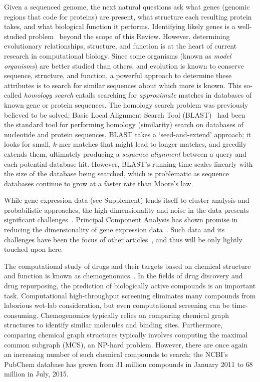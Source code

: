 \documentclass{acm_proc_article-sp}
\begin{document}
Given a sequenced genome, the next natural questions ask what genes (genomic
regions that code for proteins) are present, what structure each resulting
protein takes, and what biological function it performs.
Identifying likely genes is a well-studied problem~\cite{berger2013computational} 
beyond the scope of this Review.
However, determining evolutionary relationships, structure, and function is
at the heart of current research in computational biology.
Since some organisms (known as \emph{model organisms}) are better studied than
others, and evolution is known to conserve sequence, structure, and function,
a powerful approach to determine these attributes is to search for similar
sequences about which more is known. 
This so-called \emph{homology search} entails searching for \emph{approximate}
matches in databases of known gene or protein sequences.
The homology search problem was previously believed to be solved;
Basic Local Alignment Search Tool (BLAST)~\cite{berger2013computational} had been
the standard tool for performing homology (similarity) search on databases of nucleotide and
protein sequences.
BLAST takes a `seed-and-extend' approach; it looks for small, $k$-mer matches
that might lead to longer matches, and greedily extends them, ultimately 
producing a \emph{sequence alignment} between a query and each potential 
database hit.
However, BLAST's running-time scales linearly with the size of the database being
searched, which is problematic as sequence databases continue to grow at a
faster rate than Moore's law.

While gene expression data (see Supplement) lends itself to cluster analysis 
and probabilistic 
approaches, the high dimensionality and noise in the data presents significant 
challenges~\cite{berger2013computational}.
Principal Component Analysis has shown promise in reducing the dimensionality
of gene expression 
data~\cite{berger2013computational}.
Such data and its challenges have been the focus of other 
articles~\cite{berger2013computational}, and thus will be only lightly touched 
upon here.

The computational study of drugs and their targets based on chemical structure and function
is known as chemogenomics~\cite{bredel2004chemogenomics}.
In the fields of drug discovery and drug repurposing, the prediction 
of biologically active compounds is an important task. 
Computational high-throughput screening eliminates many compounds from 
laborious wet-lab consideration, but even computational screening can be 
time-consuming.
Chemogenomics typically relies on comparing chemical graph structures to identify
similar molecules and binding sites.
Furthermore, comparing chemical graph structures typically involves computing
the maximal common subgraph (MCS), an NP-hard problem.
However, there are once again an increasing number of such chemical compounds
to search; the NCBI's PubChem database has grown from 31 million compounds in
January 2011 to 68 million in July, 2015.
\end{document}
